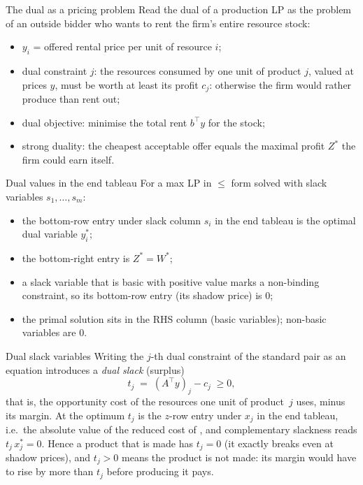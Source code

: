 \begin{rulebox}{The dual as a pricing problem}
Read the dual of a production LP as the problem of an outside bidder who
wants to rent the firm's entire resource stock:
\begin{itemize}[leftmargin=1.6em,itemsep=0.3ex]
  \item $y_{i}$ = offered rental price per unit of resource $i$;
  \item dual constraint $j$: the resources consumed by one unit of product
        $j$, valued at prices $y$, must be worth at least its profit
        $c_{j}$: otherwise the firm would rather produce than rent out;
  \item dual objective: minimise the total rent
        $b^{\top}y$ for the stock;
  \item strong duality: the cheapest acceptable offer equals the maximal
        profit $Z^{*}$ the firm could earn itself.
\end{itemize}
\end{rulebox}

\begin{rulebox}{Dual values in the end tableau}
For a max LP in $\le$ form solved with slack variables $s_{1},\dots,s_{m}$:
\begin{itemize}[leftmargin=1.6em,itemsep=0.3ex]
  \item the bottom-row entry under slack column $s_{i}$ in the end tableau
        is the optimal dual variable $y_{i}^{*}$;
  \item the bottom-right entry is $Z^{*}=W^{*}$;
  \item a slack variable that is basic with positive value marks a
        non-binding constraint, so its bottom-row entry (its shadow price)
        is $0$;
  \item the primal solution sits in the RHS column (basic variables);
        non-basic variables are $0$.
\end{itemize}
\end{rulebox}

\begin{rulebox}{Dual slack variables}
Writing the $j$-th dual constraint of the standard pair as an equation
introduces a \emph{dual slack} (surplus)
\[
  t_{j} \;=\; (A^{\top}y)_{j}-c_{j}\;\ge 0,
\]
that is, the opportunity cost of the resources one unit of product~$j$
uses, minus its margin.
At the optimum $t_{j}$ is the $z$-row entry under $x_{j}$ in the end
tableau, i.e.\ the absolute value of the reduced cost of , and
complementary slackness reads $t_{j}\,x_{j}^{*}=0$. Hence a product that is
made has $t_{j}=0$ (it exactly breaks even at shadow prices), and $t_{j}>0$
means the product is not made: its margin would have to rise by more than
$t_{j}$ before producing it pays.
\end{rulebox}


